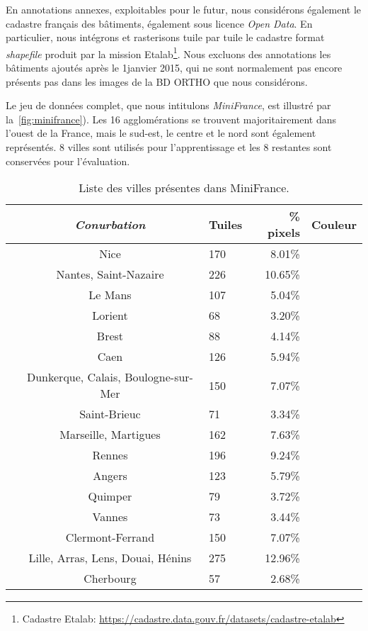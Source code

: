 En annotations annexes, exploitables pour le futur, nous considérons également le cadastre français des bâtiments, également sous licence \emph{Open Data}. En particulier, nous intégrons et rasterisons tuile par tuile le cadastre format \emph{shapefile} produit par la mission Etalab\footnote{Cadastre Etalab: \url{https://cadastre.data.gouv.fr/datasets/cadastre-etalab}}. Nous excluons des annotations les bâtiments ajoutés après le 1\ier janvier 2015, qui ne sont normalement pas encore présents pas dans les images de la BD ORTHO que nous considérons.

Le jeu de données complet, que nous intitulons \emph{MiniFrance}, est illustré par la~\cref{fig:minifrance}). Les 16 agglomérations se trouvent majoritairement dans l'ouest de la France, mais le sud-est, le centre et le nord sont également représentés. 8 villes sont utilisés pour l'apprentissage et les 8 restantes sont conservées pour l'évaluation.

\begin{table}[h]
\caption{Liste des villes présentes dans MiniFrance.}
\label{tab:minifrance}
	\begin{tabularx}{\textwidth}{c c Y r Y}
	\toprule
	& \emph{Conurbation} &  Tuiles &  \% pixels & Couleur \\
	\midrule
	 & Nice & 170 & \num{8.01}\% &  \\
	& Nantes, Saint-Nazaire  & 226 & \num{10.65}\% &  \\
	& Le Mans & 107 & \num{5.04}\% &   \\
	& Lorient & 68 & \num{3.20}\%  &  \\
	& Brest & 88  & \num{4.14}\% &  \\
	& Caen & 126 & \num{5.94}\%  &   \\
	& Dunkerque, Calais, Boulogne-sur-Mer & 150 & \num{7.07}\% &   \\
	& Saint-Brieuc & 71 &  \num{3.34}\% &  \\
	\midrule
	 & Marseille, Martigues & 162 & \num{7.63}\% &  \\
	& Rennes & 196 & \num{9.24}\% &  \\
	& Angers & 123  & \num{5.79}\% & \\
	& Quimper & 79 & \num{3.72}\% & \\
	& Vannes & 73 & \num{3.44}\% & \\
	& Clermont-Ferrand & 150 & \num{7.07}\% & \\
	& Lille, Arras, Lens, Douai, Hénins & 275 & \num{12.96}\% & \\
	& Cherbourg & 57 & \num{2.68}\% & \\ \bottomrule
	\end{tabularx}
\end{table}

